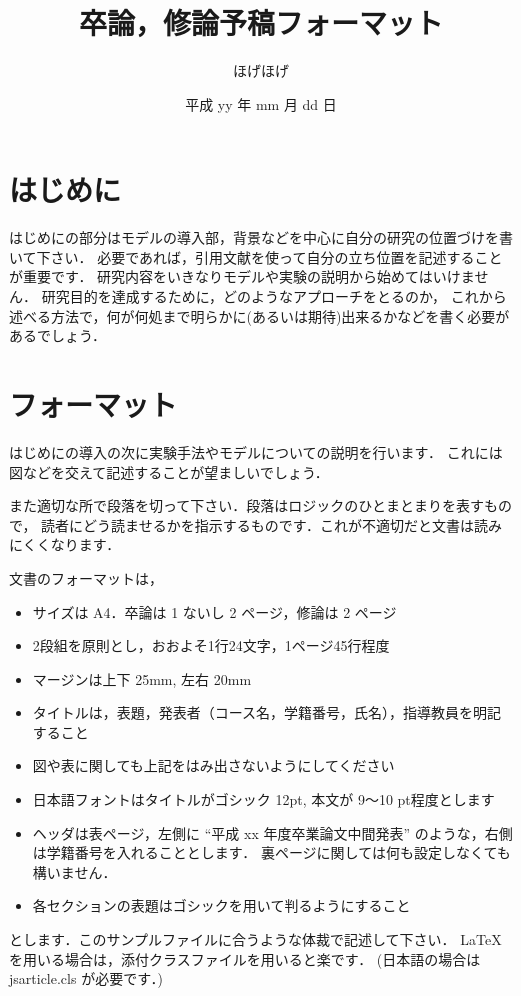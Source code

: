 \documentclass[twocolumn, a4paper, uplatex]{UECIEresume}
\title{卒論，修論予稿フォーマット}
\date{平成 yy 年 mm 月 dd 日}
\affiliation{総合情報学科 XXX コース}
\author{ほげほげ}
\begin{document}
\maketitle

\section{はじめに}
はじめにの部分はモデルの導入部，背景などを中心に自分の研究の位置づけを書いて下さい．
必要であれば，引用文献を使って自分の立ち位置を記述することが重要です．
研究内容をいきなりモデルや実験の説明から始めてはいけません．
研究目的を達成するために，どのようなアプローチをとるのか，
これから述べる方法で，何が何処まで明らかに(あるいは期待)出来るかなどを書く必要があるでしょう．

\section{フォーマット}
はじめにの導入の次に実験手法やモデルについての説明を行います．
これには図などを交えて記述することが望ましいでしょう．

また適切な所で段落を切って下さい．段落はロジックのひとまとまりを表すもので，
読者にどう読ませるかを指示するものです．これが不適切だと文書は読みにくくなります．

文書のフォーマットは，
\begin{itemize}
  \item{サイズは A4．卒論は 1 ないし 2 ページ，修論は 2 ページ}
  \item{2段組を原則とし，おおよそ1行24文字，1ページ45行程度}
  \item{マージンは上下 25mm, 左右 20mm}
  \item{タイトルは，表題，発表者（コース名，学籍番号，氏名），指導教員を明記すること}
  \item{図や表に関しても上記をはみ出さないようにしてください}
  \item{日本語フォントはタイトルがゴシック 12pt, 本文が 9〜10 pt程度とします}
  \item{ヘッダは表ページ，左側に ``平成 xx 年度卒業論文中間発表'' のような，右側は学籍番号を入れることとします．
      裏ページに関しては何も設定しなくても構いません．
    }
  \item{各セクションの表題はゴシックを用いて判るようにすること}
\end{itemize}
とします．このサンプルファイルに合うような体裁で記述して下さい．
\LaTeX を用いる場合は，添付クラスファイルを用いると楽です．
(日本語の場合は jsarticle.cls が必要です．)
\end{document}
